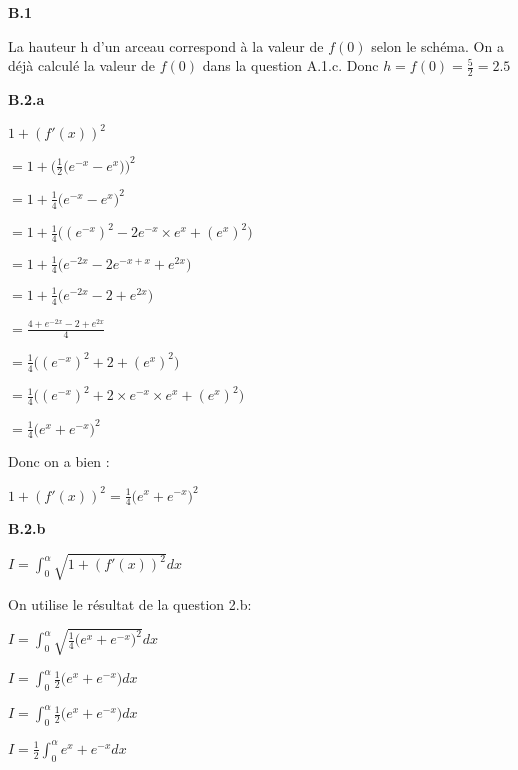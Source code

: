 \documentclass{article}
\begin{document}
\textbf{B.1}

\noindent La hauteur h d'un arceau correspond à la valeur de $f(0)$ selon le schéma. On a déjà calculé la valeur de $f(0)$ dans la question A.1.c. Donc $h = f(0) = \displaystyle\frac{5}{2} = 2.5$

\textbf{B.2.a}

\vspace{2mm}

$1+(f'(x))^2$

$= 1 + \Bigg(\displaystyle\frac{1}{2}\Big(e^{-x}-e^{x}\Big)\Bigg)^2$

$= 1 + \displaystyle\frac{1}{4}\Big(e^{-x}-e^{x}\Big)^2$

$= 1 + \displaystyle\frac{1}{4}\Big((e^{-x})^2 - 2e^{-x} \times e^{x} + (e^{x})^2 \Big)$

$= 1 + \displaystyle\frac{1}{4}\Big( e^{-2x} - 2e^{-x + x} + e^{2x} \Big)$

$= 1 + \displaystyle\frac{1}{4}\Big( e^{-2x} - 2 + e^{2x} \Big)$

$= \displaystyle\frac{4 + e^{-2x} - 2 + e^{2x}}{4}$

$= \displaystyle\frac{1}{4}\Big((e^{-x})^2 + 2 + (e^{x})^2\Big)$

$= \displaystyle\frac{1}{4}\Big((e^{-x})^2 + 2 \times e^{-x} \times e^x + (e^{x})^2\Big)$

$= \displaystyle\frac{1}{4}\Big(e^x + e^{-x}\Big)^2$

\vspace{1mm}
\noindent Donc on a bien :
\vspace{1mm}

$1 + (f'(x))^2 = \displaystyle\frac{1}{4}\Big(e^x+e^{-x}\Big)^2$

\vspace{2mm}
\textbf{B.2.b}
\vspace{2mm}

$I = \displaystyle\int_0^{\alpha}\sqrt{1+(f'(x))^2} dx$

\noindent On utilise le résultat de la question 2.b:

$I = \displaystyle\int_0^{\alpha}\sqrt{\displaystyle\frac{1}{4}\Big(e^x + e^{-x}\Big)^2} dx$

$I = \displaystyle\int_0^{\alpha}\displaystyle\frac{1}{2}\Big(e^x + e^{-x}\Big) dx$

$I = \displaystyle\int_0^{\alpha}\displaystyle\frac{1}{2}\Big(e^x + e^{-x}\Big) dx$

$I = \displaystyle\frac{1}{2} \displaystyle\int_0^{\alpha}e^x + e^{-x} dx$
\end{document}
